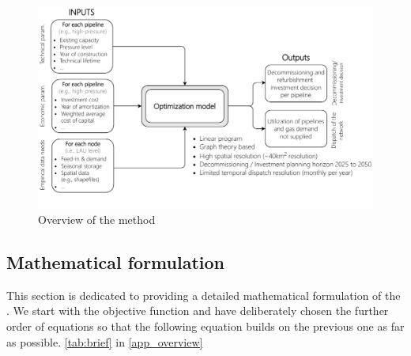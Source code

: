   \begin{figure}[h]
 	\centering
 	\includegraphics[width=1\linewidth]{figures/flowchart.pdf}
 	\caption{Overview of the method}
 	\label{fig:methodology}
 \end{figure}
 
 \subsection{Mathematical formulation}\label{Met:Equations}
 This section is dedicated to providing a detailed mathematical formulation of the . We start with the objective function and have deliberately chosen the further order of equations so that the following equation builds on the previous one as far as possible.  \ref{tab:brief} in \ref{app_overview} \vspace{0.35cm}
 

